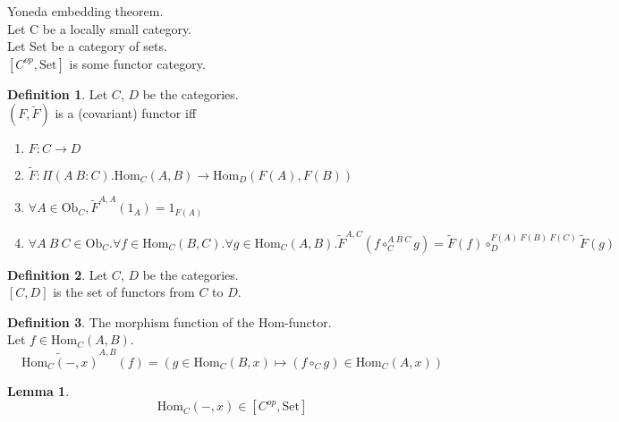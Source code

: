 \documentclass[10pt,a4paper]{article}
\theoremstyle{definition}
\newtheorem{definition}{Definition}[section]
\newtheorem{lemma}{Lemma}[section]
\newcommand{\Ob}{{\mbox{Ob}}}
\newcommand{\Hom}{{\mbox{Hom}}}
\newcommand{\Set}{{\mbox{Set}}}
\newcommand{\ra}{{\rightarrow}}
\begin{document}
Yoneda embedding theorem.\\
Let C be a locally small category.\\
Let Set be a category of sets.\\
$[C^{op},\mbox{Set}]$ is some functor category.\\

\begin{definition}
Let $C$, $D$ be the categories.\\
 $(F, \widetilde{F})$ is a (covariant) functor iff\\
\begin{enumerate}
\item $F:C \ra D$
\item $\widetilde{F}:\Pi(A\ B:C).\Hom_C(A,B) \ra \Hom_D(F(A), F(B))$
\item $\forall A\in \Ob_C, \widetilde{F}^{A,A}(1_A)=1_{F(A)}$
\item $\forall A\ B\ C \in \Ob_C.\forall f\in\Hom_C(B,C).\forall g\in\Hom_C(A,B). \widetilde{F}^{A,C}(f\circ_C^{A\ B\ C} g)=\widetilde{F}(f)\circ_D^{F(A)\ F(B)\ F(C)} \widetilde{F}(g)$
\end{enumerate}

\end{definition}

\begin{definition}
Let $C$, $D$ be the categories.\\
$[C,D]$ is the set of functors from $C$ to $D$.\\
\end{definition}

\begin{definition} The morphism function of the Hom-functor.\\
Let $f\in\Hom_{C}(A,B)$.
$$\widetilde{\Hom_C(-,x)}^{A,B}(f) = (g \in\Hom_C(B,x) \mapsto (f \circ_C g) \in\Hom_C(A,x))$$
\end{definition}

\begin{lemma}
$$\Hom_C(-, x) \in [C^{op},\Set]$$
\end{lemma}
\end{document}
